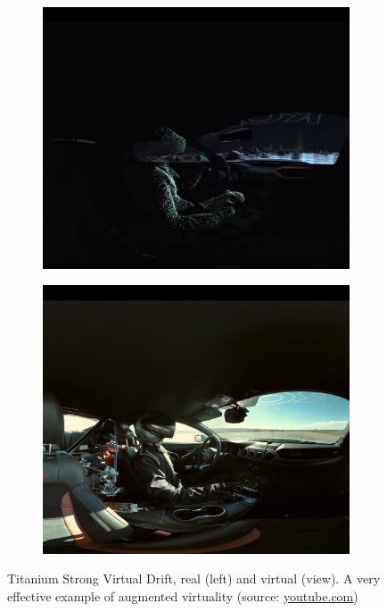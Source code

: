 \begin{figure}
\centering
\begin{subfigure}{0.49\textwidth}    
\centering
\includegraphics[scale=0.5]{pictures/titanium-a}
\end{subfigure}
\begin{subfigure}{0.49\textwidth}
\centering
\includegraphics[scale=0.5]{pictures/titanium-b}
\end{subfigure}
\caption{Titanium Strong Virtual Drift, real (left) and virtual (view). A very effective example of augmented virtuality (source: \href{https://www.youtube.com/watch?v=WJyG76Izk8M}{youtube.com})}
\end{figure}

